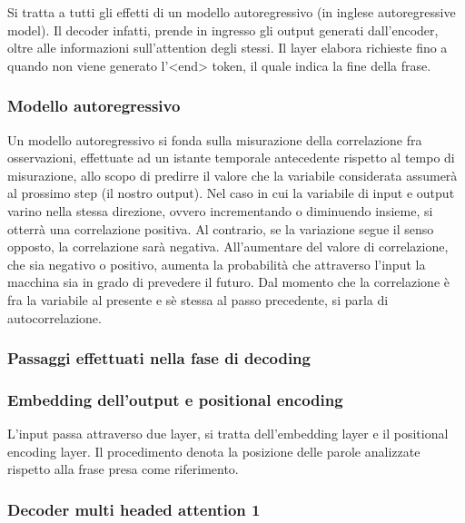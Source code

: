 Si tratta a tutti gli effetti di un modello autoregressivo (in inglese autoregressive model). 
Il decoder infatti, prende in ingresso gli output generati dall'encoder, oltre alle informazioni sull'attention degli stessi. Il layer elabora richieste fino a quando non viene generato l'<end> token, il quale indica la fine della frase.

\subsubsection{Modello autoregressivo}

Un modello autoregressivo si fonda sulla misurazione della correlazione fra osservazioni, effettuate ad un istante temporale antecedente rispetto al tempo di misurazione, allo scopo di predirre il valore che la variabile considerata assumerà al prossimo step (il nostro output). Nel caso in cui la variabile di input e output varino nella stessa direzione, ovvero incrementando o diminuendo insieme, si otterrà una correlazione positiva. Al contrario, se la variazione segue il senso opposto, la correlazione sarà negativa. All'aumentare del valore di correlazione, che sia negativo o positivo, aumenta la probabilità che attraverso l'input la macchina sia in grado di prevedere il futuro. Dal momento che la correlazione è fra la variabile al presente e sè stessa al passo precedente, si parla di autocorrelazione.

\subsubsection{Passaggi effettuati nella fase di decoding}

\subsubsection{Embedding dell'output e positional encoding}

L'input passa attraverso due layer, si tratta dell'embedding layer e il positional encoding layer. Il procedimento denota la posizione delle parole analizzate rispetto alla frase presa come riferimento.

\subsubsection{Decoder multi headed attention 1}

